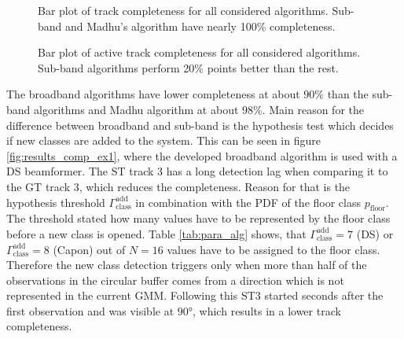 \begin{figure}[!ht]
	\centering
	\begin{minipage}[t]{.49\textwidth}
		\def\svgwidth{1\linewidth}
		  \small
		\caption{Bar plot of track completeness for all considered algorithms. Sub-band and Madhu's algorithm have nearly 100\% completeness.}
		\label{fig:results_comp}
	\end{minipage}%
	\hfill
	\begin{minipage}[t]{.49\textwidth}
		\centering{}
		\def\svgwidth{1\linewidth}
		\small
		\caption{Bar plot of active track completeness for all considered algorithms. Sub-band algorithms perform 20\% points better than the rest.}
		\label{fig:results_comp_act}
	\end{minipage}
\end{figure}

The broadband algorithms have lower completeness at about $90\%$ than the sub-band algorithms and Madhu algorithm at about $98\%$. Main reason for the difference between broadband and sub-band is the hypothesis test which decides if new classes are added to the system. This can be seen in figure \ref{fig:results_comp_ex1}, where the developed broadband algorithm is used with a \ac{DS} beamformer. The \ac{ST} track 3 has a long detection lag when comparing it to the \ac{GT} track 3, which reduces the completeness. Reason for that is the hypothesis threshold $\Gamma_\text{class}^\text{add}$ in combination with the PDF of the floor class $p_\text{floor}$. The threshold stated how many values have to be represented by the floor class before a new class is opened. Table \ref{tab:para_alg} shows, that $\Gamma_\text{class}^\text{add}=7$ (\ac{DS}) or $\Gamma_\text{class}^\text{add}=8$ (Capon) out of $N=16$ values have to be assigned to the floor class. Therefore the new class detection triggers only when more than half of the observations in the circular buffer comes from a direction which is not represented in the current \ac{GMM}. Following this ST3 started seconds after the first observation and was visible at $\ang{90}$, which results in a lower track completeness.

